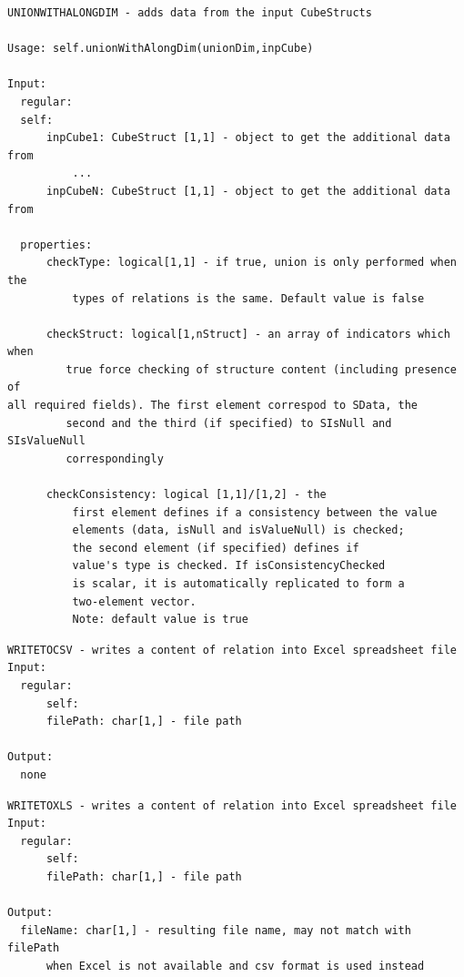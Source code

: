 \documentclass[letterpaper,10pt,english]{sphinxmanual}
\begin{document}
\begin{Verbatim}[commandchars=\\\{\}]
UNIONWITHALONGDIM - adds data from the input CubeStructs

Usage: self.unionWithAlongDim(unionDim,inpCube)

Input:
  regular:
  self:
      inpCube1: CubeStruct [1,1] - object to get the additional data from
          ...
      inpCubeN: CubeStruct [1,1] - object to get the additional data from

  properties:
      checkType: logical[1,1] - if true, union is only performed when the
          types of relations is the same. Default value is false

      checkStruct: logical[1,nStruct] - an array of indicators which when
         true force checking of structure content (including presence of
all required fields). The first element correspod to SData, the
         second and the third (if specified) to SIsNull and SIsValueNull
         correspondingly

      checkConsistency: logical [1,1]/[1,2] - the
          first element defines if a consistency between the value
          elements (data, isNull and isValueNull) is checked;
          the second element (if specified) defines if
          value's type is checked. If isConsistencyChecked
          is scalar, it is automatically replicated to form a
          two-element vector.
          Note: default value is true
\end{Verbatim}
\label{chap_func:smartdb-relations-atypifiedstaticrelation-writetocsv}
\begin{Verbatim}[commandchars=\\\{\}]
WRITETOCSV - writes a content of relation into Excel spreadsheet file
Input:
  regular:
      self:
      filePath: char[1,] - file path

Output:
  none
\end{Verbatim}
\label{chap_func:smartdb-relations-atypifiedstaticrelation-writetoxls}
\begin{Verbatim}[commandchars=\\\{\}]
WRITETOXLS - writes a content of relation into Excel spreadsheet file
Input:
  regular:
      self:
      filePath: char[1,] - file path

Output:
  fileName: char[1,] - resulting file name, may not match with filePath
      when Excel is not available and csv format is used instead
\end{Verbatim}
\end{document}
